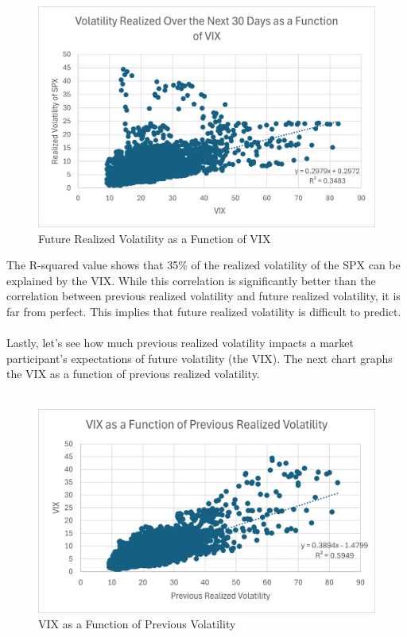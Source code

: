 \documentclass[11pt, oneside]{book}
\begin{document}
\\
\\
\begin{figure}[H]
\centering
\includegraphics[width=\textwidth]{RealizedVolatilityVersusVIXForward.png}
\caption{Future Realized Volatility as a Function of VIX} \label{Fig-RealizedVolVersusVIX}
\end{figure}
\noindent
The R-squared value shows that 35\% of the realized volatility of the SPX can be explained by the VIX. While this correlation is significantly better than the correlation between previous realized volatility and future realized volatility, it is far from perfect. This implies that future realized volatility is difficult to predict.\\
\\
Lastly, let's see how much previous realized volatility impacts a market participant's expectations of future volatility (the VIX). The next chart graphs the VIX as a function of previous realized volatility.
\\
\\
\begin{figure}[H]
\centering
\includegraphics[width=\textwidth]{VIXVersusPreviousRealizedVolatility.png}
\caption{VIX as a Function of Previous Volatility} \label{Fig-VIXAgainstPrevVol}
\end{figure}
\end{document}
